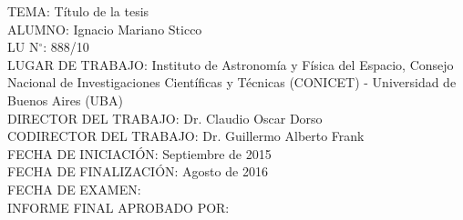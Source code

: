 \begin{flushleft}
TEMA: Título de la tesis\\

ALUMNO: Ignacio Mariano Sticco\\

LU N$^{\circ}$: 888/10 \\

LUGAR DE TRABAJO: Instituto de Astronom\'ia y F\'isica del Espacio, Consejo Nacional de Investigaciones Cient\'ificas y T\'ecnicas (CONICET) - Universidad de Buenos Aires (UBA)\\

DIRECTOR DEL TRABAJO: Dr. Claudio Oscar Dorso \\

CODIRECTOR DEL TRABAJO: Dr. Guillermo Alberto Frank\\

FECHA DE INICIACI\'ON: Septiembre de 2015 \\

FECHA DE FINALIZACI\'ON: Agosto de 2016\\

FECHA DE EXAMEN:  \\

INFORME FINAL APROBADO POR:
\end{flushleft}                                                              %
\vspace{2cm}

